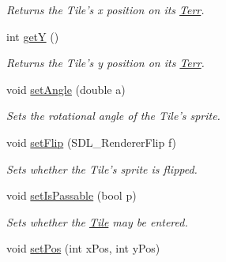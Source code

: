 \begin{DoxyCompactItemize}
\begin{DoxyCompactList}\small\item\em Returns the Tile’s x position on its \hyperlink{class_terr}{Terr}. \end{DoxyCompactList}\item 
int \hyperlink{class_tile_acf97bff4aac74cc8d7e09bc8ca5afa68}{getY} ()\hypertarget{class_tile_acf97bff4aac74cc8d7e09bc8ca5afa68}{}\label{class_tile_acf97bff4aac74cc8d7e09bc8ca5afa68}

\begin{DoxyCompactList}\small\item\em Returns the Tile’s y position on its \hyperlink{class_terr}{Terr}. \end{DoxyCompactList}\item 
void \hyperlink{class_tile_a94f9e2d35e55c1d1b9f56dbd7816f51a}{set\+Angle} (double a)\hypertarget{class_tile_a94f9e2d35e55c1d1b9f56dbd7816f51a}{}\label{class_tile_a94f9e2d35e55c1d1b9f56dbd7816f51a}

\begin{DoxyCompactList}\small\item\em Sets the rotational angle of the Tile’s sprite. \end{DoxyCompactList}\item 
void \hyperlink{class_tile_a801a349b0e7f7500b60af91e5e821f2e}{set\+Flip} (S\+D\+L\+\_\+\+Renderer\+Flip f)\hypertarget{class_tile_a801a349b0e7f7500b60af91e5e821f2e}{}\label{class_tile_a801a349b0e7f7500b60af91e5e821f2e}

\begin{DoxyCompactList}\small\item\em Sets whether the Tile’s sprite is flipped. \end{DoxyCompactList}\item 
void \hyperlink{class_tile_aef0ce26fbd9688dababd9d66d8e604e7}{set\+Is\+Passable} (bool p)\hypertarget{class_tile_aef0ce26fbd9688dababd9d66d8e604e7}{}\label{class_tile_aef0ce26fbd9688dababd9d66d8e604e7}

\begin{DoxyCompactList}\small\item\em Sets whether the \hyperlink{class_tile}{Tile} may be entered. \end{DoxyCompactList}\item 
void \hyperlink{class_tile_a8a6429d2adbe3e45c519d86a57b514c3}{set\+Pos} (int x\+Pos, int y\+Pos)\hypertarget{class_tile_a8a6429d2adbe3e45c519d86a57b514c3}{}\label{class_tile_a8a6429d2adbe3e45c519d86a57b514c3}


\end{DoxyCompactItemize}
